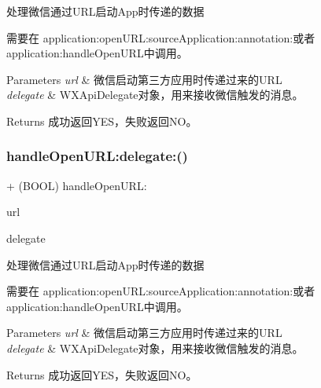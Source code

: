 处理微信通过\+U\+R\+L启动\+App时传递的数据 

需要在 application\+:open\+U\+R\+L\+:source\+Application\+:annotation\+:或者application\+:handle\+Open\+U\+R\+L中调用。 
\begin{DoxyParams}{Parameters}
{\em url} & 微信启动第三方应用时传递过来的\+U\+RL \\
\hline
{\em delegate} & W\+X\+Api\+Delegate对象，用来接收微信触发的消息。 \\
\hline
\end{DoxyParams}
\begin{DoxyReturn}{Returns}
成功返回\+Y\+E\+S，失败返回\+N\+O。 
\end{DoxyReturn}
\mbox{\label{interface_w_x_api_aab36d7c09414d7bc3d7ca200b48f2f9c}} 
\subsubsection{\texorpdfstring{handle\+Open\+U\+R\+L\+:delegate\+:()}{handleOpenURL:delegate:()}\hspace{0.1cm}{\footnotesize\ttfamily [3/3]}}
{\footnotesize\ttfamily + (B\+O\+OL) handle\+Open\+U\+R\+L\+: \begin{DoxyParamCaption}\item[{(N\+S\+U\+RL $\ast$)}]{url }\item[{delegate:(id$<$ W\+X\+Api\+Delegate $>$)}]{delegate }\end{DoxyParamCaption}}



处理微信通过\+U\+R\+L启动\+App时传递的数据 

需要在 application\+:open\+U\+R\+L\+:source\+Application\+:annotation\+:或者application\+:handle\+Open\+U\+R\+L中调用。 
\begin{DoxyParams}{Parameters}
{\em url} & 微信启动第三方应用时传递过来的\+U\+RL \\
\hline
{\em delegate} & W\+X\+Api\+Delegate对象，用来接收微信触发的消息。 \\
\hline
\end{DoxyParams}
\begin{DoxyReturn}{Returns}
成功返回\+Y\+E\+S，失败返回\+N\+O。 
\end{DoxyReturn}
\mbox{\label{interface_w_x_api_a3684676bea249fdd0708a38ee74f0604}} 
